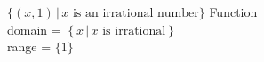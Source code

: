 {$ \{(x, 1) \, | \, x \text{ is an irrational number}\}$}
{Function \\ domain =  $\left\{ x \, | \, x \text{ is irrational}\right\}$ \\ range = $\{1\}$}